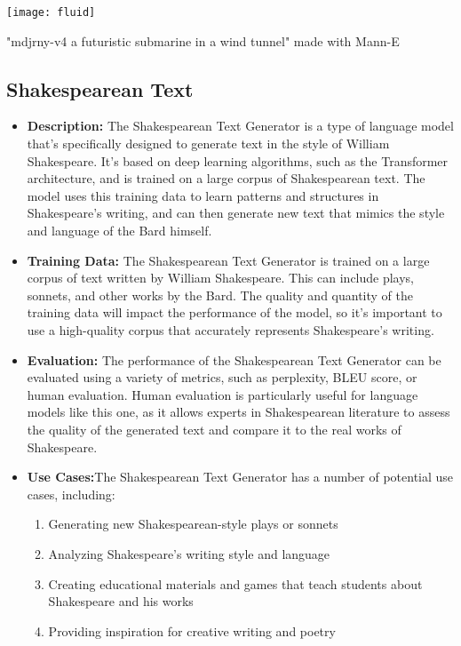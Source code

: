 \begin{marginfigure}[-5.5cm]
        \texttt{[image: fluid]}
        \caption{"mdjrny-v4 a futuristic submarine in a wind tunnel" made with Mann-E}
\end{marginfigure}

\subsection{Shakespearean Text} 

\begin{itemize}
\item \textbf{Description:} The Shakespearean Text Generator is a type of language model that's specifically designed to generate text in the style of William Shakespeare. It's based on deep learning algorithms, such as the Transformer architecture, and is trained on a large corpus of Shakespearean text. The model uses this training data to learn patterns and structures in Shakespeare's writing, and can then generate new text that mimics the style and language of the Bard himself.
\item \textbf{Training Data:} The Shakespearean Text Generator is trained on a large corpus of text written by William Shakespeare. This can include plays, sonnets, and other works by the Bard. The quality and quantity of the training data will impact the performance of the model, so it's important to use a high-quality corpus that accurately represents Shakespeare's writing.
\item \textbf{Evaluation:} The performance of the Shakespearean Text Generator can be evaluated using a variety of metrics, such as perplexity, BLEU score, or human evaluation. Human evaluation is particularly useful for language models like this one, as it allows experts in Shakespearean literature to assess the quality of the generated text and compare it to the real works of Shakespeare.
\item \textbf{Use Cases:}The Shakespearean Text Generator has a number of potential use cases, including:
    \begin{enumerate}
        \item Generating new Shakespearean-style plays or sonnets
        \item Analyzing Shakespeare's writing style and language
        \item Creating educational materials and games that teach students about Shakespeare and his works
        \item Providing inspiration for creative writing and poetry

\end{enumerate}
\end{itemize}
